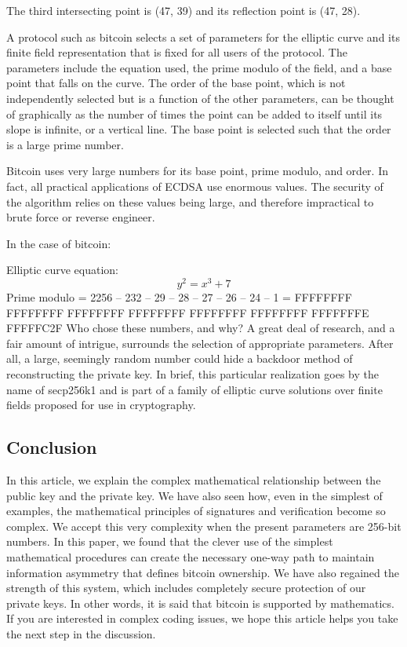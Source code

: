 \begin{flushleft}
The third intersecting point is (47, 39) and its reflection point is (47, 28).

A protocol such as bitcoin selects a set of parameters for the elliptic curve and its finite field representation that is fixed for all users of the protocol. The parameters include the equation used, the prime modulo of the field, and a base point that falls on the curve. The order of the base point, which is not independently selected but is a function of the other parameters, can be thought of graphically as the number of times the point can be added to itself until its slope is infinite, or a vertical line. The base point is selected such that the order is a large prime number.

Bitcoin uses very large numbers for its base point, prime modulo, and order. In fact, all practical applications of ECDSA use enormous values. The security of the algorithm relies on these values being large, and therefore impractical to brute force or reverse engineer.

In the case of bitcoin:

Elliptic curve equation: 
\begin{equation}
y^2 = x^3 + 7
\end{equation}
Prime modulo = 2256 – 232 – 29 – 28 – 27 – 26 – 24 – 1 = FFFFFFFF FFFFFFFF FFFFFFFF FFFFFFFF FFFFFFFF FFFFFFFF FFFFFFFE FFFFFC2F
Who chose these numbers, and why? A great deal of research, and a fair amount of intrigue, surrounds the selection of appropriate parameters. After all, a large, seemingly random number could hide a backdoor method of reconstructing the private key. In brief, this particular realization goes by the name of secp256k1 and is part of a family of elliptic curve solutions over finite fields proposed for use in cryptography.



\subsection{Conclusion}

In this article, we explain the complex mathematical relationship between the public key and the private key. We have also seen how, even in the simplest of examples, the mathematical principles of signatures and verification become so complex. We accept this very complexity when the present parameters are 256-bit numbers. In this paper, we found that the clever use of the simplest mathematical procedures can create the necessary one-way path to maintain information asymmetry that defines bitcoin ownership. We have also regained the strength of this system, which includes completely secure protection of our private keys.
In other words, it is said that bitcoin is supported by mathematics. If you are interested in complex coding issues, we hope this article helps you take the next step in the discussion.\textcite{rykwalder_2014}


\end{flushleft}
